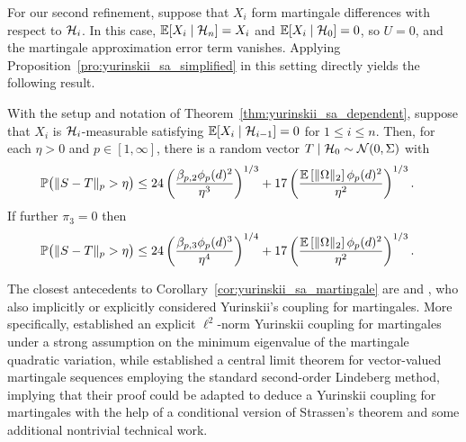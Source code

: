 For our second refinement, suppose that
$X_i$ form martingale differences with respect to $\mathcal{H}_i$.
In this case, $\mathbb{E}[X_i \mid \mathcal{H}_n] = X_i$ and $\mathbb{E}[X_i \mid \mathcal{H}_0] = 0$,
so $U = 0$, and the martingale approximation error term vanishes.
Applying Proposition~\ref{pro:yurinskii_sa_simplified} in this setting
directly yields the following result.
%
\begin{corollary}%
  \label{cor:yurinskii_sa_martingale}

  With the setup and notation of Theorem~\ref{thm:yurinskii_sa_dependent},
  suppose that
  $X_i$ is $\mathcal{H}_i$-measurable satisfying $\mathbb{E}[X_i \mid \mathcal{H}_{i-1}] = 0$ for
  $1 \leq i \leq n$. Then, for each $\eta > 0$ and $p \in [1,\infty]$, there is
  a random vector $T \mid \mathcal{H}_0 \sim \mathcal{N}(0, \Sigma)$ with
  \begin{align}
    \label{eq:yurinskii_sa_martingale_order_2}
    \mathbb{P}\big(\|S-T\|_p > \eta\big)
    &\leq
    24 \left(
      \frac{\beta_{p,2} \phi_p(d)^2}{\eta^3}
    \right)^{1/3}
    + 17 \left(
      \frac{\mathbb{E} \left[ \|\Omega\|_2 \right] \phi_p(d)^2}{\eta^2}
    \right)^{1/3}.
  \end{align}
  If further $\pi_3 = 0$ then
  \begin{align}
    \label{eq:yurinskii_sa_martingale_order_3}
    \mathbb{P}\big(\|S-T\|_p > \eta\big)
    &\leq
    24 \left(
      \frac{\beta_{p,3} \phi_p(d)^3}{\eta^4}
    \right)^{1/4}
    + 17 \left(
      \frac{\mathbb{E} \left[ \|\Omega\|_2 \right] \phi_p(d)^2}{\eta^2}
    \right)^{1/3}.
  \end{align}
\end{corollary}

The closest antecedents to Corollary~\ref{cor:yurinskii_sa_martingale} are
\citet{belloni2018high} and \citet{li2020uniform}, who also implicitly or
explicitly considered Yurinskii's coupling for martingales. More specifically,
\citet[Theorem~1]{li2020uniform} established an explicit
$\ell^2$-norm Yurinskii coupling
for martingales under a strong assumption on the minimum eigenvalue of the
martingale quadratic variation, while \citet[Theorem~2.1]{belloni2018high}
established a central limit theorem for vector-valued martingale sequences
employing the standard second-order Lindeberg method, implying that their proof
could be adapted to deduce a Yurinskii coupling for martingales with the help
of a conditional version of Strassen's theorem \citep{chen2020jackknife} and
some additional nontrivial technical work.

